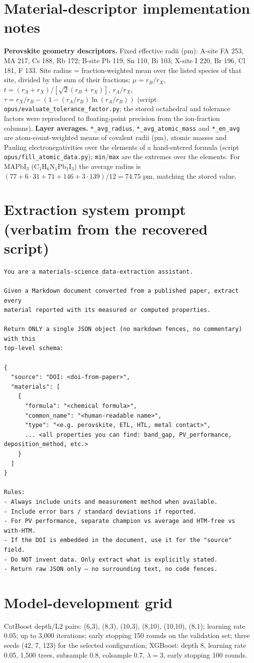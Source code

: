 \documentclass[10pt]{article}
\begin{document}
\section*{Material-descriptor implementation notes}
\noindent\textbf{Perovskite geometry descriptors.} Fixed effective radii (pm): A-site FA 253, MA 217, Cs 188, Rb 172; B-site Pb 119, Sn 110, Bi 103; X-site I 220, Br 196, Cl 181, F 133. Site radius = fraction-weighted mean over the listed species of that site, divided by the sum of their fractions; $\mu=r_B/r_X$, $t=(r_A+r_X)/[\sqrt2(r_B+r_X)]$, $r_A/r_X$, $\tau=r_X/r_B-(1-(r_A/r_B)\ln(r_A/r_B))$ (script \texttt{opus/evaluate\_tolerance\_factor.py}; the stored octahedral and tolerance factors were reproduced to floating-point precision from the ion-fraction columns). \textbf{Layer averages.} \texttt{*\_avg\_radius}, \texttt{*\_avg\_atomic\_mass} and \texttt{*\_en\_avg} are atom-count-weighted means of covalent radii (pm), atomic masses and Pauling electronegativities over the elements of a hand-entered formula (script \texttt{opus/fill\_atomic\_data.py}); \texttt{min}/\texttt{max} are the extremes over the elements. For MAPbI$_3$ (C$_1$H$_6$N$_1$Pb$_1$I$_3$) the average radius is $(77+6\cdot31+71+146+3\cdot139)/12=74.75$ pm, matching the stored value.\par
\section*{Extraction system prompt (verbatim from the recovered script)}\begin{verbatim}You are a materials-science data-extraction assistant.

Given a Markdown document converted from a published paper, extract every
material reported with its measured or computed properties.

Return ONLY a single JSON object (no markdown fences, no commentary) with this
top-level schema:

{
  "source": "DOI: <doi-from-paper>",
  "materials": [
    {
      "formula": "<chemical formula>",
      "common_name": "<human-readable name>",
      "type": "<e.g. perovskite, ETL, HTL, metal contact>",
      ... <all properties you can find: band_gap, PV_performance, deposition_method, etc.>
    }
  ]
}

Rules:
- Always include units and measurement method when available.
- Include error bars / standard deviations if reported.
- For PV performance, separate champion vs average and HTM-free vs with-HTM.
- If the DOI is embedded in the document, use it for the "source" field.
- Do NOT invent data. Only extract what is explicitly stated.
- Return raw JSON only – no surrounding text, no code fences.
\end{verbatim}
\section*{Model-development grid}CatBoost depth/L2 pairs: (6,3), (8,3), (10,3), (8,10), (10,10), (8,1); learning rate 0.05; up to 3,000 iterations; early stopping 150 rounds on the validation set; three seeds (42, 7, 123) for the selected configuration; XGBoost: depth 8, learning rate 0.05, 1,500 trees, subsample 0.8, colsample 0.7, $\lambda=3$, early stopping 100 rounds.
\end{document}
